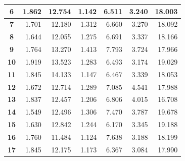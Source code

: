 \documentclass[12pt]{article}
\begin{document}
\begin{table}[!htbp]
{\begin{tabular}{crrrrr|r|}
\multicolumn{1}{|c|}{\textbf{6}} & \multicolumn{1}{r|}{1.862} & \multicolumn{1}{r|}{12.754} & \multicolumn{1}{r|}{1.142} & \multicolumn{1}{r|}{6.511} & 3.240 & 18.003 \\ \hline
\multicolumn{1}{|c|}{\textbf{7}} & \multicolumn{1}{r|}{1.701} & \multicolumn{1}{r|}{12.180} & \multicolumn{1}{r|}{1.312} & \multicolumn{1}{r|}{6.660} & 3.270 & 18.092 \\ \hline
\multicolumn{1}{|c|}{\textbf{8}} & \multicolumn{1}{r|}{1.644} & \multicolumn{1}{r|}{12.055} & \multicolumn{1}{r|}{1.275} & \multicolumn{1}{r|}{6.691} & 3.337 & 18.166 \\ \hline
\multicolumn{1}{|c|}{\textbf{9}} & \multicolumn{1}{r|}{1.764} & \multicolumn{1}{r|}{13.270} & \multicolumn{1}{r|}{1.413} & \multicolumn{1}{r|}{7.793} & 3.724 & 17.966 \\ \hline
\multicolumn{1}{|c|}{\textbf{10}} & \multicolumn{1}{r|}{1.919} & \multicolumn{1}{r|}{13.523} & \multicolumn{1}{r|}{1.283} & \multicolumn{1}{r|}{6.493} & 3.174 & 19.029 \\ \hline
\multicolumn{1}{|c|}{\textbf{11}} & \multicolumn{1}{r|}{1.845} & \multicolumn{1}{r|}{14.133} & \multicolumn{1}{r|}{1.147} & \multicolumn{1}{r|}{6.467} & 3.339 & 18.053 \\ \hline
\multicolumn{1}{|c|}{\textbf{12}} & \multicolumn{1}{r|}{1.672} & \multicolumn{1}{r|}{12.714} & \multicolumn{1}{r|}{1.289} & \multicolumn{1}{r|}{7.085} & 4.541 & 17.988 \\ \hline
\multicolumn{1}{|c|}{\textbf{13}} & \multicolumn{1}{r|}{1.837} & \multicolumn{1}{r|}{12.457} & \multicolumn{1}{r|}{1.206} & \multicolumn{1}{r|}{6.806} & 4.015 & 16.708 \\ \hline
\multicolumn{1}{|c|}{\textbf{14}} & \multicolumn{1}{r|}{1.549} & \multicolumn{1}{r|}{12.496} & \multicolumn{1}{r|}{1.306} & \multicolumn{1}{r|}{7.470} & 3.787 & 19.678 \\ \hline
\multicolumn{1}{|c|}{\textbf{15}} & \multicolumn{1}{r|}{1.630} & \multicolumn{1}{r|}{12.842} & \multicolumn{1}{r|}{1.244} & \multicolumn{1}{r|}{6.170} & 3.345 & 19.188 \\ \hline
\multicolumn{1}{|c|}{\textbf{16}} & \multicolumn{1}{r|}{1.760} & \multicolumn{1}{r|}{11.484} & \multicolumn{1}{r|}{1.124} & \multicolumn{1}{r|}{7.638} & 3.188 & 18.199 \\ \hline
\multicolumn{1}{|c|}{\textbf{17}} & \multicolumn{1}{r|}{1.845} & \multicolumn{1}{r|}{12.175} & \multicolumn{1}{r|}{1.173} & \multicolumn{1}{r|}{6.367} & 3.084 & 17.990 \\ \hline

\end{tabular}}
\end{table}
\end{document}
